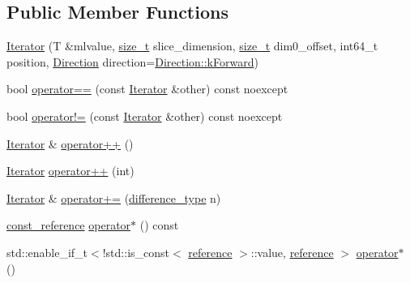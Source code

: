 \subsection*{Public Member Functions}
\begin{DoxyCompactItemize}
\item 
\mbox{\hyperlink{classonnxruntime_1_1MLValueTensorSlicer_1_1Iterator_a3cf3c5e88a712753ab3c0d7a728fa0df}{Iterator}} (T \&mlvalue, \mbox{\hyperlink{mlasi_8h_a503efbc1c6e50825320ad909366b78ab}{size\+\_\+t}} slice\+\_\+dimension, \mbox{\hyperlink{mlasi_8h_a503efbc1c6e50825320ad909366b78ab}{size\+\_\+t}} dim0\+\_\+offset, int64\+\_\+t position, \mbox{\hyperlink{classonnxruntime_1_1MLValueTensorSlicer_1_1Iterator_ad83ea2768d16fdaead62f58e6190a0c1}{Direction}} direction=\mbox{\hyperlink{classonnxruntime_1_1MLValueTensorSlicer_1_1Iterator_ad83ea2768d16fdaead62f58e6190a0c1ae7c3602dce09c755e09250077a601a51}{Direction\+::k\+Forward}})
\item 
bool \mbox{\hyperlink{classonnxruntime_1_1MLValueTensorSlicer_1_1Iterator_a6aea224055665bfbb5f538060a4cdd75}{operator==}} (const \mbox{\hyperlink{classonnxruntime_1_1MLValueTensorSlicer_1_1Iterator}{Iterator}} \&other) const noexcept
\item 
bool \mbox{\hyperlink{classonnxruntime_1_1MLValueTensorSlicer_1_1Iterator_a091b61988d4a78e6fb3f8d9b1de7d468}{operator!=}} (const \mbox{\hyperlink{classonnxruntime_1_1MLValueTensorSlicer_1_1Iterator}{Iterator}} \&other) const noexcept
\item 
\mbox{\hyperlink{classonnxruntime_1_1MLValueTensorSlicer_1_1Iterator}{Iterator}} \& \mbox{\hyperlink{classonnxruntime_1_1MLValueTensorSlicer_1_1Iterator_a172403b59d8c520d0d9f5515e4188ba0}{operator++}} ()
\item 
\mbox{\hyperlink{classonnxruntime_1_1MLValueTensorSlicer_1_1Iterator}{Iterator}} \mbox{\hyperlink{classonnxruntime_1_1MLValueTensorSlicer_1_1Iterator_ac751c6e41f9d708d7e5d73223c53ee99}{operator++}} (int)
\item 
\mbox{\hyperlink{classonnxruntime_1_1MLValueTensorSlicer_1_1Iterator}{Iterator}} \& \mbox{\hyperlink{classonnxruntime_1_1MLValueTensorSlicer_1_1Iterator_a31b88ce78e2603bb70fd20b87b80fe45}{operator+=}} (\mbox{\hyperlink{classonnxruntime_1_1MLValueTensorSlicer_1_1Iterator_a927741252788936cc33b0c46e86ad646}{difference\+\_\+type}} n)
\item 
\mbox{\hyperlink{classonnxruntime_1_1MLValueTensorSlicer_1_1Iterator_aafbb938cecd84d85c4eef5b9e4332873}{const\+\_\+reference}} \mbox{\hyperlink{classonnxruntime_1_1MLValueTensorSlicer_1_1Iterator_a64da46bb41ce7eca8e644e31890507c4}{operator$\ast$}} () const
\item 
std\+::enable\+\_\+if\+\_\+t$<$!std\+::is\+\_\+const$<$ \mbox{\hyperlink{classonnxruntime_1_1MLValueTensorSlicer_1_1Iterator_a528f0b8364b23168f0565c1503b44cd0}{reference}} $>$\+::value, \mbox{\hyperlink{classonnxruntime_1_1MLValueTensorSlicer_1_1Iterator_a528f0b8364b23168f0565c1503b44cd0}{reference}} $>$ \mbox{\hyperlink{classonnxruntime_1_1MLValueTensorSlicer_1_1Iterator_a84eeddda16f4d2a08e1ea2bd005ce905}{operator$\ast$}} ()
\end{DoxyCompactItemize}


